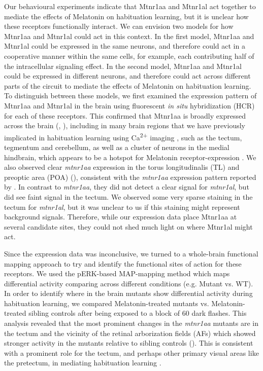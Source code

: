 \documentclass[9.5pt]{RandlettLab_elife}            %
\begin{document}
Our behavioural experiments indicate that Mtnr1aa and Mtnr1al act together to mediate the effects of Melatonin on habituation learning, but it is unclear how these receptors functionally interact.
We can envision two models for how Mtnr1aa and Mtnr1al could act in this context.
In the first model, Mtnr1aa and Mtnr1al could be expressed in the same neurons, and therefore could act in a cooperative manner within the same cells, for example, each contributing half of the intracellular signaling effect.
In the second model, Mtnr1aa and Mtnr1al could be expressed in different neurons, and therefore could act across different parts of the circuit to mediate the effects of Melatonin on habituation learning.
To distinguish between these models, we first examined the expression pattern of Mtnr1aa and Mtnr1al in the brain using fluorescent \emph{in situ} hybridization (HCR) for each of these receptors. 
This confirmed that Mtnr1aa is broadly expressed across the brain (\citealp{Hill2026}, ), including in many brain regions that we have previously implicated in habituation learning using Ca\textsuperscript{2+} imaging \citep{Lamire2023-he}, such as the tectum, tegmentum and cerebellum, as well as a cluster of neurons in the medial hindbrain, which appears to be a hotspot for Melatonin receptor-expression \citep{Hill2026}.
We also observed clear \emph{mtnr1aa} expression in the torus longitudinalis (TL) and preoptic area (POA) (), consistent with the \emph{mtnr1aa} expression pattern reported by \citet{Hill2026}. 
In contrast to \emph{mtnr1aa}, they did not detect a clear signal for \emph{mtnr1al}, but did see faint signal in the tectum. 
We observed some very sparse staining in the tectum for \emph{mtnr1al}, but it was unclear to us if this staining might represent background signals. 
Therefore, while our expression data place Mtnr1aa at several candidate sites, they could not shed much light on where Mtnr1al might act.

Since the expression data was inconclusive, we turned to a whole-brain functional mapping approach to try and identify the functional sites of action for these receptors.
We used the pERK-based MAP-mapping method \citep{Randlett2015} which maps differential activity comparing across different conditions (e.g. Mutant vs. WT). 
In order to identify where in the brain mutants show differential activity during habituation learning, we compared Melatonin-treated mutants vs. Melatonin-treated sibling controls after being exposed to a block of 60 dark flashes. 
This analysis revealed that the most prominent changes in the \emph{mtnr1aa} mutants are in the tectum and the vicinity of the retinal arborization fields (AFs) which showed stronger activity in the mutants relative to sibling controls (). This is consistent with a prominent role for the tectum, and perhaps other primary visual areas like the pretectum, in mediating habituation learning \citep{Lamire2023-he}. 
\end{document}
